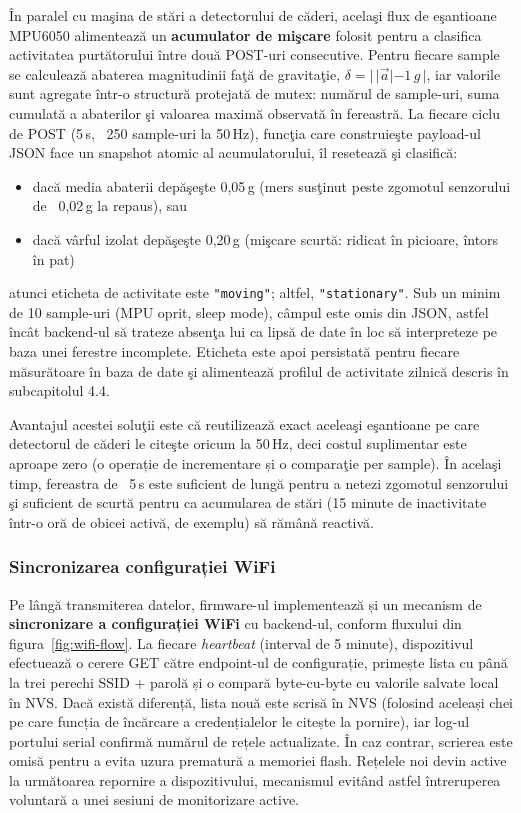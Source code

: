 \documentclass[12pt,a4paper,twoside]{article}
\begin{document}
În paralel cu maşina de stări a detectorului de căderi, acelaşi flux de eşantioane MPU6050 alimentează un \textbf{acumulator de mişcare} folosit pentru a clasifica activitatea purtătorului între două POST-uri consecutive. Pentru fiecare sample se calculează abaterea magnitudinii faţă de gravitaţie, $\delta = | \, |\vec{a}| - 1\,g \, |$, iar valorile sunt agregate într-o structură protejată de mutex: numărul de sample-uri, suma cumulată a abaterilor şi valoarea maximă observată în fereastră. La fiecare ciclu de POST (5\,s, ~250 sample-uri la 50\,Hz), funcţia care construieşte payload-ul JSON face un snapshot atomic al acumulatorului, îl resetează şi clasifică:

\begin{itemize}[leftmargin=1.5em]
\item dacă media abaterii depăşeşte 0,05\,g (mers susţinut peste zgomotul senzorului de ~0,02\,g la repaus), sau
\item dacă vârful izolat depăşeşte 0,20\,g (mişcare scurtă: ridicat în picioare, întors în pat)
\end{itemize}

atunci eticheta de activitate este \texttt{"moving"}; altfel, \texttt{"stationary"}. Sub un minim de 10 sample-uri (MPU oprit, sleep mode), câmpul este omis din JSON, astfel încât backend-ul să trateze absenţa lui ca lipsă de date în loc să interpreteze pe baza unei ferestre incomplete. Eticheta este apoi persistată pentru fiecare măsurătoare în baza de date şi alimentează profilul de activitate zilnică descris în subcapitolul 4.4.

Avantajul acestei soluţii este că reutilizează exact aceleaşi eşantioane pe care detectorul de căderi le citeşte oricum la 50\,Hz, deci costul suplimentar este aproape zero (o operație de incrementare și o comparaţie per sample). În acelaşi timp, fereastra de ~5\,s este suficient de lungă pentru a netezi zgomotul senzorului şi suficient de scurtă pentru ca acumularea de stări (15 minute de inactivitate într-o oră de obicei activă, de exemplu) să rămână reactivă.

\subsubsection{Sincronizarea configurației WiFi}

Pe lângă transmiterea datelor, firmware-ul implementează și un mecanism de \textbf{sincronizare a configurației WiFi} cu backend-ul, conform fluxului din figura~\ref{fig:wifi-flow}. La fiecare \textit{heartbeat} (interval de 5 minute), dispozitivul efectuează o cerere GET către endpoint-ul de configurație, primește lista cu până la trei perechi SSID + parolă și o compară byte-cu-byte cu valorile salvate local în NVS. Dacă există diferență, lista nouă este scrisă în NVS (folosind aceleași chei pe care funcția de încărcare a credențialelor le citește la pornire), iar log-ul portului serial confirmă numărul de rețele actualizate. În caz contrar, scrierea este omisă pentru a evita uzura prematură a memoriei flash. Rețelele noi devin active la următoarea repornire a dispozitivului, mecanismul evitând astfel întreruperea voluntară a unei sesiuni de monitorizare active.
\end{document}
